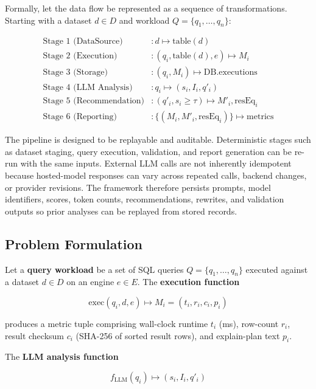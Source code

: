 \documentclass[conference]{IEEEtran}
\begin{document}
Formally, let the data flow be represented as a sequence of transformations. Starting with a dataset $d \in D$ and workload $Q = \{q_1, \ldots, q_n\}$:

\begin{align}
\text{Stage 1 (DataSource)} &: d \mapsto \text{table}(d) \\
\text{Stage 2 (Execution)} &: (q_i, \text{table}(d), e) \mapsto M_i \\
\text{Stage 3 (Storage)} &: (q_i, M_i) \mapsto \text{DB}.\text{executions} \\
\text{Stage 4 (LLM Analysis)} &: q_i \mapsto (s_i, I_i, q'_i) \\
\text{Stage 5 (Recommendation)} &: (q'_i, s_i \geq \tau) \mapsto M'_i, \text{resEq}_i \\
\text{Stage 6 (Reporting)} &: \{(M_i, M'_i, \text{resEq}_i)\} \mapsto \text{metrics}
\end{align}

The pipeline is designed to be replayable and auditable. Deterministic stages such as dataset staging, query execution, validation, and report generation can be re-run with the same inputs. External LLM calls are not inherently idempotent because hosted-model responses can vary across repeated calls, backend changes, or provider revisions. The framework therefore persists prompts, model identifiers, scores, token counts, recommendations, rewrites, and validation outputs so prior analyses can be replayed from stored records.

\subsection{Problem Formulation}
Let a \textbf{query workload} be a set of SQL queries $Q = \{q_1, \ldots, q_n\}$ executed against a dataset $d \in D$ on an engine $e \in E$. The \textbf{execution function}

\begin{equation}
\text{exec}(q_i, d, e) \mapsto M_i = (t_i, r_i, c_i, p_i)
\label{eq:exec}
\end{equation}

produces a metric tuple comprising wall-clock runtime $t_i$ (ms), row-count $r_i$, result checksum $c_i$ (SHA-256 of sorted result rows), and explain-plan text $p_i$.

The \textbf{LLM analysis function}

\begin{equation}
f_{\text{LLM}}(q_i) \mapsto (s_i, I_i, q'_i)
\label{eq:llm}
\end{equation}
\end{document}
